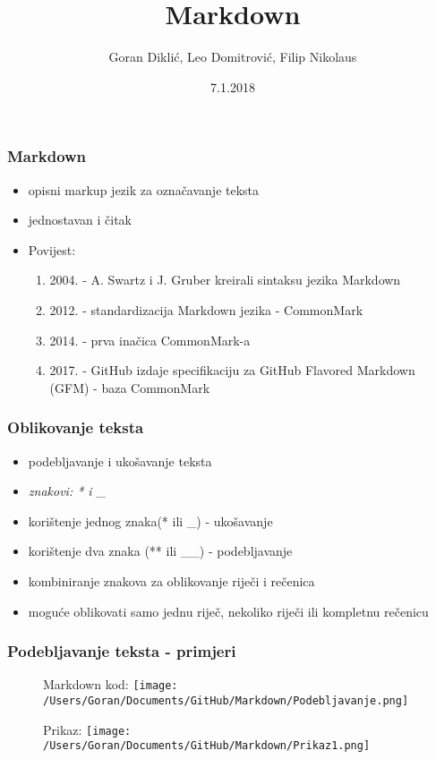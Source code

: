 \documentclass{beamer}
\title{Markdown}
\author{Goran Diklić, Leo Domitrović, Filip Nikolaus}
\date{7.1.2018}
\begin{document}
\maketitle

\newpage

\begin{frame}
\frametitle{Markdown}

\begin{itemize}
\item opisni markup jezik za označavanje teksta
\item jednostavan i čitak
\item Povijest:
\begin{enumerate}
\item 2004. - A. Swartz i J. Gruber kreirali sintaksu jezika Markdown
\item 2012. - standardizacija Markdown jezika - CommonMark
\item 2014. - prva inačica CommonMark-a
\item 2017. - GitHub izdaje specifikaciju za GitHub Flavored Markdown
(GFM) - baza CommonMark
\end{enumerate}

	
\end{itemize}
\end{frame}

\newpage

\begin{frame}
\frametitle{Oblikovanje teksta}
\begin{itemize}
\item podebljavanje i ukošavanje teksta
\item \emph{znakovi: * i  \_}
\item korištenje jednog znaka(* ili \_) - ukošavanje
\item korištenje dva znaka (** ili \_\_) - podebljavanje
\item kombiniranje znakova za oblikovanje riječi i rečenica
\item moguće oblikovati samo jednu riječ, nekoliko riječi ili kompletnu rečenicu
\end{itemize}
\end{frame}

\newpage

\begin{frame}
\frametitle{Podebljavanje teksta - primjeri}

\begin{figure}
{Markdown kod:}
\texttt{[image: /Users/Goran/Documents/GitHub/Markdown/Podebljavanje.png]}
\end{figure}

\begin{figure}
{Prikaz:}
\texttt{[image: /Users/Goran/Documents/GitHub/Markdown/Prikaz1.png]}
\end{figure}

\end{frame}
\end{document}
